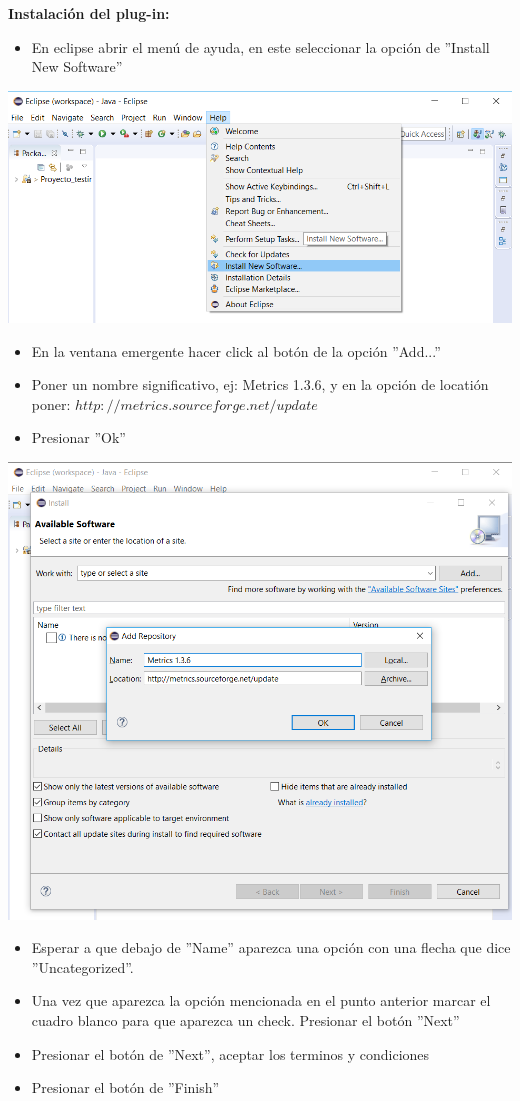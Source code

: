 \documentclass[a4paper]{article}
\begin{document}
\textbf{Instalación del plug-in:}
\begin{itemize}
  \item En eclipse abrir el menú de ayuda, en este seleccionar la opción de ''Install New Software''
\end{itemize}
\centering
  \includegraphics[scale=0.5]{Instalacion_1}
\begin{itemize}
  \item En la ventana emergente hacer click al botón de la opción ''Add...''
  \item Poner un nombre significativo, ej: Metrics 1.3.6, y en la opción de locatión poner:  $http://metrics.sourceforge.net/update$
  \item Presionar ''Ok''
\end{itemize}
  \includegraphics[scale=0.5]{Instalacion_2}
\begin{itemize}
  \item Esperar a que debajo de ''Name'' aparezca una opción con una flecha que dice ''Uncategorized''.
  \item Una vez que aparezca la opción mencionada en el punto anterior marcar el cuadro blanco para que aparezca un check. Presionar el botón ''Next''
  \item Presionar el botón de ''Next'', aceptar los terminos y condiciones
  \item Presionar el botón de ''Finish''\\
\end{itemize}
\end{document}
